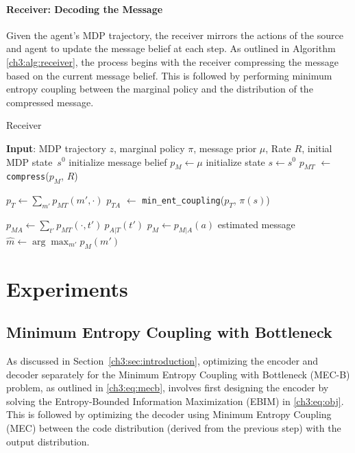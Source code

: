 \paragraph{Receiver: Decoding the Message}
Given the agent’s MDP trajectory, the receiver mirrors the actions of the source and agent to update the message belief at each step. As outlined in Algorithm \ref{ch3:alg:receiver}, the process begins with the receiver compressing the message based on the current message belief. This is followed by performing minimum entropy coupling between the marginal policy and the distribution of the compressed message.

\begin{algorithm}[h!]
\caption{Receiver} \label{ch3:alg:receiver}
\begin{algorithmic}[1]
    \State \textbf{Input}: MDP trajectory $z$, marginal policy $\pi$, message prior $\mu$, Rate $R$, initial MDP state~$s^0$
    \State initialize message belief $p_M \gets \mu$
    \State initialize state $s \gets s^0$
        \State $p_{MT}$ $\gets$ \texttt{compress}($p_M$, $R$)
        
        \State $p_{T} \gets \sum_{m'} p_{MT}(m', \cdot)$
        \State $p_{TA}$ $\gets$ \texttt{min\_ent\_coupling}($p_T$, $\pi(s)$)
    
    
        \State $p_{MA} \gets \sum_{t'} p_{MT}(\cdot, t') \ p_{A|T}(t') $
        \State $p_{M} \gets p_{M|A}(a)$
    \EndFor
    \State estimated message $\hat{m} \gets \arg\max_{m'} p_M(m')$
\end{algorithmic}
\end{algorithm}


\section{Experiments}\label{ch3:sec:exp}

\subsection{Minimum Entropy Coupling with Bottleneck}

As discussed in Section~\ref{ch3:sec:introduction}, optimizing the encoder and decoder separately for the Minimum Entropy Coupling with Bottleneck (MEC-B) problem, as outlined in \eqref{ch3:eq:mecb}, involves first designing the encoder by solving the Entropy-Bounded Information Maximization (EBIM) in \eqref{ch3:eq:obj}. This is followed by optimizing the decoder using Minimum Entropy Coupling (MEC) between the code distribution (derived from the previous step) with the output distribution.

